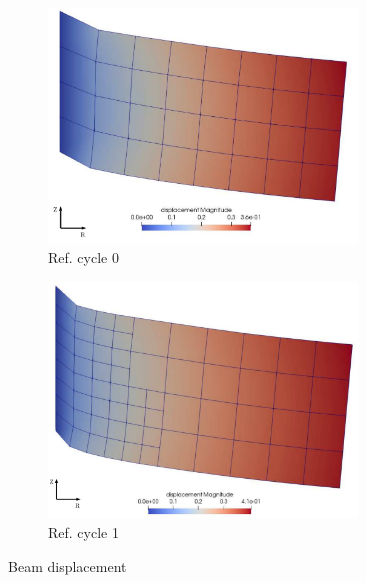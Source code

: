 \documentclass[11pt,a4paper,final]{article}
\begin{document}
\begin{figure}[h]
\centering
\begin{subfigure}[b]{0.45\textwidth}
\centering
\includegraphics[width=0.9\textwidth]{beam_ref_0_full_load.pdf}
\caption{Ref. cycle 0}
\label{fig:1.5.2}
\end{subfigure}
\begin{subfigure}[b]{0.45\textwidth}
\centering
\includegraphics[width=0.9\textwidth]{beam_ref_1_full_load.pdf}
\caption{Ref. cycle 1}
\label{fig:1.5.4}
\end{subfigure}
\caption{Beam displacement}
\label{fig:1.5}
\end{figure}
\end{document}
